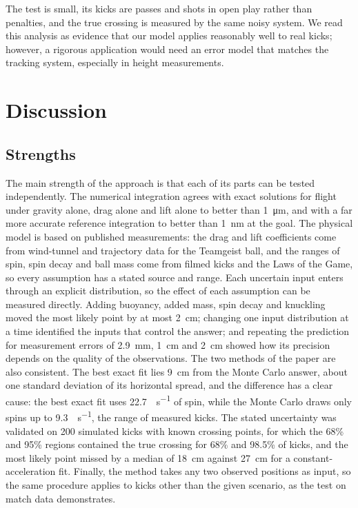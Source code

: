 \documentclass[10pt,a4paper]{article}
\begin{document}
The test is small, its kicks are passes and shots in open play rather than
penalties, and the true crossing is measured by the same noisy system. We
read this analysis as evidence that our model applies reasonably well to real kicks; however, a rigorous application would need an error model that matches the
tracking system, especially in height measurements.

\section{Discussion}
\label{sec:discussion}

\subsection{Strengths}

The main strength of the approach is that each of its parts can be tested
independently. The numerical integration agrees with exact solutions for
flight under gravity alone, drag alone and lift alone to better than
\SI{1}{\micro\metre}, and with a far more accurate reference integration to
better than \SI{1}{\nano\metre} at the goal. The physical model is based on
published measurements: the drag and lift coefficients come from wind-tunnel
and trajectory data for the Teamgeist ball, and the ranges of spin, spin
decay and ball mass come from filmed kicks and the Laws of the Game, so every
assumption has a stated source and range. Each uncertain input enters
through an explicit distribution, so the effect of each assumption can be
measured directly. Adding buoyancy, added mass, spin decay and knuckling
moved the most likely point by at most \SI{2}{\centi\metre}; changing one
input distribution at a time identified the inputs that control the answer;
and repeating the prediction for measurement errors of
\SI{2.9}{\milli\metre}, \SI{1}{\centi\metre} and \SI{2}{\centi\metre} showed
how its precision depends on the quality of the observations. The two methods
of the paper are also consistent. The best exact fit lies
\SI{9}{\centi\metre} from the Monte Carlo answer, about one standard
deviation of its horizontal spread, and the difference has a clear cause: the
best exact fit uses \SI{22.7}{\rev\per\second} of spin, while the Monte Carlo
draws only spins up to \SI{9.3}{\rev\per\second}, the range of measured kicks. The stated uncertainty was
validated on 200 simulated kicks with known crossing points, for which the
68\% and 95\% regions contained the true crossing for 68\% and 98.5\% of
kicks, and the most likely point missed by a median of \SI{18}{\centi\metre}
against \SI{27}{\centi\metre} for a constant-acceleration fit. Finally, the
method takes any two observed positions as input, so the same procedure
applies to kicks other than the given scenario, as the test on match data
demonstrates.
\end{document}
